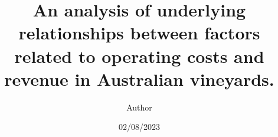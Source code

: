 \documentclass[review,12pt,authoryear]{elsarticle}
\begin{document}
\begin{linenumbers}
\begin{frontmatter}




\title{An analysis of underlying relationships between factors related to operating costs and revenue in Australian vineyards.}




\author[label1,label2,label3]{Author}
\date{02/08/2023}



\end{frontmatter}
\end{linenumbers}
\end{document}
